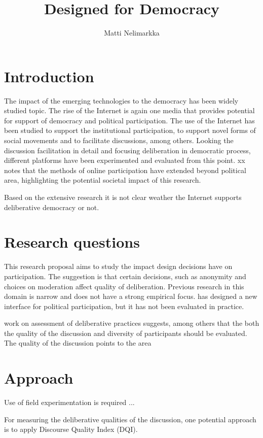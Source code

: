 \documentclass[journal,a4paper]{IEEEtran}
\author{Matti Nelimarkka}
\title{Designed for Democracy}
\begin{document}
\maketitle

\section{Introduction}

The impact of the emerging technologies to the democracy has been widely studied topic. The rise of the Internet is again one media that provides potential for support of democracy and political participation. The use of the Internet has been studied to support the institutional participation, to support novel forms of social movements and to facilitate discussions, among others. Looking the discussion facilitation in detail and focusing deliberation in democratic process, different platforms have been experimented and evaluated from this point.  xx notes that the methods of online participation have extended beyond political area, highlighting the potential societal impact of this research.

Based on the extensive research it is not clear weather the Internet supports deliberative democracy or not.

\section{Research questions}

This research proposal aims to study the impact design decisions have on participation. The suggestion is that certain decisions, such as anonymity and choices on moderation affect quality of deliberation. Previous research in this domain is narrow and does not have a strong empirical focus.  has designed a new interface for political participation, but it has not been evaluated in practice. 

 work on assessment of deliberative practices suggests, among others that the both the quality of the discussion and diversity of participants should be evaluated. The quality of the discussion points to the area

\section{Approach}

Use of field experimentation is required ...

For measuring the deliberative qualities of the discussion, one potential approach is to apply  Discourse Quality Index (DQI).



\end{document}
